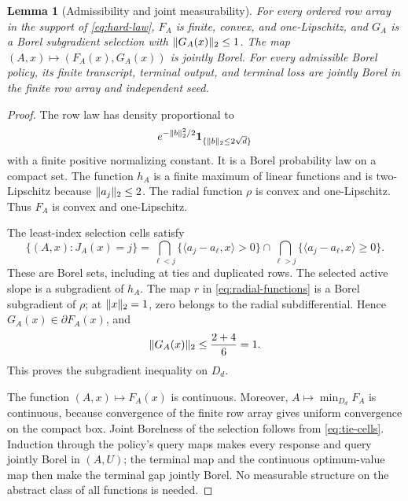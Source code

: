 \documentclass[11pt]{article}
\numberwithin{equation}{section}
\newtheorem{lemma}[lemma]{Lemma}
\theoremstyle{definition}
\theoremstyle{remark}
\newcommand{\one}{\mathbf 1}
\DeclarePairedDelimiter{\norm}{\lVert}{\rVert}
\newcommand{\ip}[2]{\langle #1,#2\rangle}
\begin{document}
\begin{lemma}[Admissibility and joint measurability]\label{lem:hard-borel}
For every ordered row array in the support of \eqref{eq:hard-law}, $F_A$ is finite, convex, and one-Lipschitz, and $G_A$ is a Borel subgradient selection with $\norm{G_A(x)}_2\le1$. The map $(A,x)\mapsto(F_A(x),G_A(x))$ is jointly Borel. For every admissible Borel policy, its finite transcript, terminal output, and terminal loss are jointly Borel in the finite row array and independent seed.
\end{lemma}
\begin{proof}
The row law has density proportional to
\[
e^{-\norm{b}_2^2/2}\one_{\{\norm{b}_2\le2\sqrt d\}}
\]
with a finite positive normalizing constant. It is a Borel probability law on a compact set. The function $h_A$ is a finite maximum of linear functions and is two-Lipschitz because $\norm{a_j}_2\le2$. The radial function $\rho$ is convex and one-Lipschitz. Thus $F_A$ is convex and one-Lipschitz.

The least-index selection cells satisfy
\begin{equation}\label{eq:tie-cells}
\{(A,x):J_A(x)=j\}
=\bigcap_{\ell<j}\{\ip{a_j-a_\ell}{x}>0\}
\cap\bigcap_{\ell>j}\{\ip{a_j-a_\ell}{x}\ge0\}.
\end{equation}
These are Borel sets, including at ties and duplicated rows. The selected active slope is a subgradient of $h_A$. The map $r$ in \eqref{eq:radial-functions} is a Borel subgradient of $\rho$; at $\norm{x}_2=1$, zero belongs to the radial subdifferential. Hence $G_A(x)\in\partial F_A(x)$, and
\[
\norm{G_A(x)}_2\le\frac{2+4}6=1.
\]
This proves the subgradient inequality on $D_d$.

The function $(A,x)\mapsto F_A(x)$ is continuous. Moreover, $A\mapsto\min_{D_d}F_A$ is continuous, because convergence of the finite row array gives uniform convergence on the compact box. Joint Borelness of the selection follows from \eqref{eq:tie-cells}. Induction through the policy's query maps makes every response and query jointly Borel in $(A,U)$; the terminal map and the continuous optimum-value map then make the terminal gap jointly Borel. No measurable structure on the abstract class of all functions is needed.
\end{proof}
\end{document}
